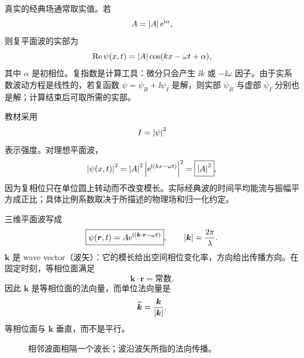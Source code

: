 

真实的经典场通常取实值。若
\[
  A=\left|A\right|\mathrm{e}^{\mathrm{i}\alpha},
\]
则复平面波的实部为
\begin{equation}
  \operatorname{Re}\psi(x,t)
  =\left|A\right|\cos(kx-\omega t+\alpha),
  \label{eq:QM-C03-S01-real-wave}
\end{equation}
其中 $\alpha$ 是初相位。复指数是计算工具：微分只会产生 $\ii k$ 或 $-\ii\omega$ 因子。由于实系数波动方程是线性的，若复函数 $\psi=\psi_R+\ii\psi_I$ 是解，则实部 $\psi_R$ 与虚部 $\psi_I$ 分别也是解；计算结束后可取所需的实部。

教材采用
\begin{equation}
  I=\left|\psi\right|^2
  \label{eq:QM-C03-S01-intensity}
\end{equation}
表示强度。对理想平面波，
\begin{equation}
  \left|\psi(x,t)\right|^2
  =\left|A\right|^2
   \left|\mathrm{e}^{\mathrm{i}(kx-\omega t)}\right|^2
  =\boxed{\left|A\right|^2},
  \label{eq:QM-C03-S01-plane-wave-intensity}
\end{equation}
因为复相位只在单位圆上转动而不改变模长。实际经典波的时间平均能流与振幅平方成正比；具体比例系数取决于所描述的物理场和归一化约定。

三维平面波写成
\begin{equation}
  \boxed{
  \psi(\bm r,t)
  =A\mathrm{e}^{\mathrm{i}(\bm k\cdot\bm r-\omega t)}},
  \qquad
  \left|\bm k\right|=\frac{2\pi}{\lambda}.
  \label{eq:QM-C03-S01-three-dimensional-wave}
\end{equation}
$\bm k$ 是 wave vector（波矢）：它的模长给出空间相位变化率，方向给出传播方向。在固定时刻，等相位面满足
\begin{equation}
  \bm k\cdot\bm r=\text{常数}.
  \label{eq:QM-C03-S01-wavefront}
\end{equation}
因此 $\bm k$ 是等相位面的法向量，而单位法向量是
\[
  \widehat{\bm k}=\frac{\bm k}{\left|\bm k\right|}.
\]
等相位面与 $\bm k$ 垂直，而不是平行。

\begin{figure}[htbp]
  \centering
  \caption{相邻波面相隔一个波长；波沿波矢所指的法向传播。}
  \label{fig:QM-C03-S01-wavefronts}
\end{figure}

